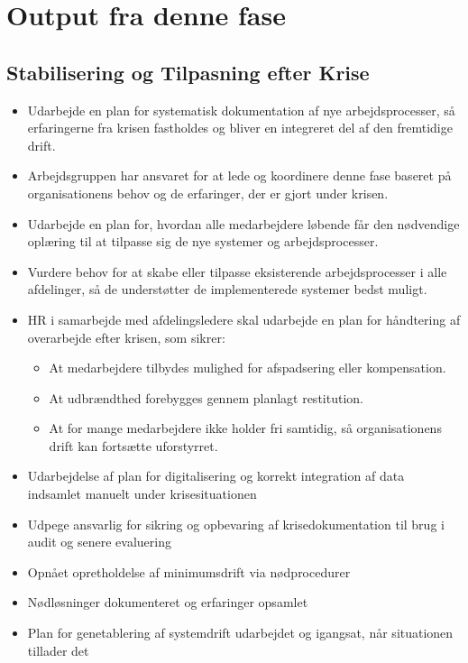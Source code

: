 \documentclass[a4paper,11pt]{book}
\begin{document}
\section{Output fra denne fase}\label{output-fra-denne-fase}

\subsection{Stabilisering og Tilpasning efter
Krise}\label{stabilisering-og-tilpasning-efter-krise}

\begin{itemize}
\item
  Udarbejde en plan for systematisk dokumentation af nye
  arbejdsprocesser, så erfaringerne fra krisen fastholdes og bliver en
  integreret del af den fremtidige drift.
\item
  Arbejdsgruppen har ansvaret for at lede og koordinere denne fase
  baseret på organisationens behov og de erfaringer, der er gjort under
  krisen.
\item
  Udarbejde en plan for, hvordan alle medarbejdere løbende får den
  nødvendige oplæring til at tilpasse sig de nye systemer og
  arbejdsprocesser.
\item
  Vurdere behov for at skabe eller tilpasse eksisterende
  arbejdsprocesser i alle afdelinger, så de understøtter de
  implementerede systemer bedst muligt.
\item
  HR i samarbejde med afdelingsledere skal udarbejde en plan for
  håndtering af overarbejde efter krisen, som sikrer:

  \begin{itemize}
  \tightlist
  \item
    At medarbejdere tilbydes mulighed for afspadsering eller
    kompensation.
  \item
    At udbrændthed forebygges gennem planlagt restitution.
  \item
    At for mange medarbejdere ikke holder fri samtidig, så
    organisationens drift kan fortsætte uforstyrret.
  \end{itemize}
\item
  Udarbejdelse af plan for digitalisering og korrekt integration af data
  indsamlet manuelt under krisesituationen
\item
  Udpege ansvarlig for sikring og opbevaring af krisedokumentation til
  brug i audit og senere evaluering
\item
  Opnået opretholdelse af minimumsdrift via nødprocedurer
\item
  Nødløsninger dokumenteret og erfaringer opsamlet
\item
  Plan for genetablering af systemdrift udarbejdet og igangsat, når
  situationen tillader det
\end{itemize}
\end{document}
